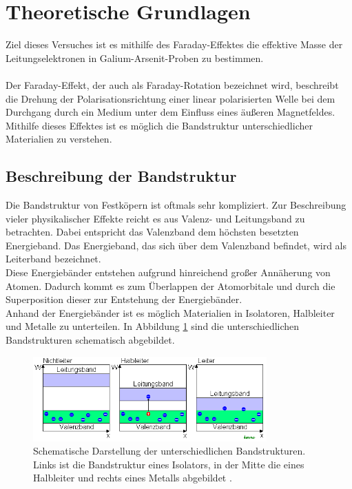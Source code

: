 \section{Theoretische Grundlagen}
Ziel dieses Versuches ist es mithilfe des Faraday-Effektes die effektive Masse der Leitungselektronen in
Galium-Arsenit-Proben zu bestimmen. \\
\\
Der Faraday-Effekt, der auch als Faraday-Rotation bezeichnet wird, beschreibt die Drehung der
Polarisationsrichtung einer linear polarisierten Welle bei dem Durchgang durch ein Medium
unter dem Einfluss eines äußeren Magnetfeldes. Mithilfe dieses Effektes ist es möglich die
Bandstruktur unterschiedlicher Materialien zu verstehen. \\

\subsection{Beschreibung der Bandstruktur}
Die Bandstruktur von Festköpern ist oftmals sehr kompliziert. Zur Beschreibung vieler physikalischer
Effekte reicht es aus Valenz- und Leitungsband zu betrachten.
Dabei entspricht das Valenzband dem höchsten besetzten Energieband. Das Energieband, das sich über dem
Valenzband befindet, wird als Leiterband bezeichnet. \\
Diese Energiebänder entstehen aufgrund hinreichend großer Annäherung von Atomen. Dadurch kommt es zum
Überlappen der Atomorbitale und durch die Superposition dieser zur Entstehung der Energiebänder. \\
Anhand der Energiebänder ist es möglich Materialien in Isolatoren, Halbleiter und Metalle zu unterteilen.
In Abbildung \ref{fig:Bandstrukturen} sind die unterschiedlichen Bandstrukturen schematisch abgebildet.
\begin{figure}[H]
    \centering
    \includegraphics[width=0.8\textwidth]{images/Bandstruktur.png}
    \caption{Schematische Darstellung der unterschiedlichen Bandstrukturen. Links ist die Bandstruktur eines Isolators,
    in der Mitte die eines Halbleiter und rechts eines Metalls abgebildet \cite{BS}.}
    \label{fig:Bandstrukturen}
\end{figure} \noindent
